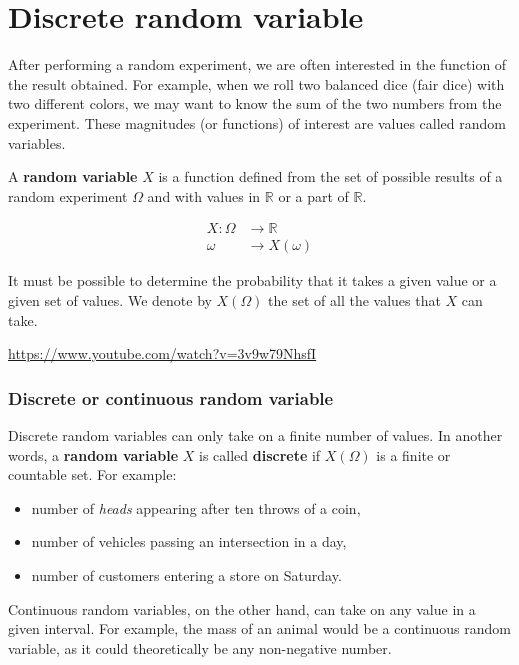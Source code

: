 \documentclass[
  letterpaper,
  DIV=11,
  numbers=noendperiod]{scrreprt}
\providecommand{\tightlist}{%
  \setlength{\itemsep}{0pt}\setlength{\parskip}{0pt}}\usepackage{longtable,booktabs,array}
\begin{document}
\chapter{Discrete random variable}\label{discrete-random-variable}

After performing a random experiment, we are often interested in the
function of the result obtained. For example, when we roll two balanced
dice (fair dice) with two different colors, we may want to know the sum
of the two numbers from the experiment. These magnitudes (or functions)
of interest are values called random variables.

A \textbf{random variable} \(X\) is a function defined from the set of
possible results of a random experiment \(\Omega\) and with values in
\(\mathbb{R}\) or a part of \(\mathbb{R}\).

\[\begin{align}
X : \Omega &\to \mathbb{R} \\
    \omega &\to X(\omega)
\end{align}\]

It must be possible to determine the probability that it takes a given
value or a given set of values. We denote by \(X( \Omega)\) the set of
all the values that \(X\) can take.

\url{https://www.youtube.com/watch?v=3v9w79NhsfI}

\subsection{Discrete or continuous random
variable}\label{discrete-or-continuous-random-variable}

Discrete random variables can only take on a finite number of values. In
another words, a \textbf{random variable} \(X\) is called
\textbf{discrete} if \(X(\Omega)\) is a finite or countable set. For
example:

\begin{itemize}
\tightlist
\item
  number of \emph{heads} appearing after ten throws of a coin,
\item
  number of vehicles passing an intersection in a day,
\item
  number of customers entering a store on Saturday.
\end{itemize}

Continuous random variables, on the other hand, can take on any value in
a given interval. For example, the mass of an animal would be a
continuous random variable, as it could theoretically be any
non-negative number.
\end{document}
